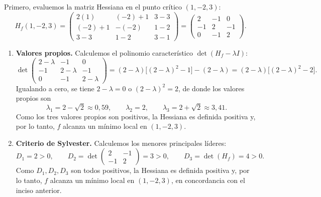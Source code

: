 \documentclass[11pt,respuestas,a4]{aleph-examen}
\begin{document}
\begin{preguntas}
\begin{respuesta}
Primero, evaluemos la matriz Hessiana en el punto crítico $(1,-2,3)$:
\[
    H_f(1,-2,3)
    =
    \begin{pmatrix}
        2(1) & (-2)+1 & 3-3\\
        (-2)+1 & -(-2) & 1-2\\
        3-3 & 1-2 & 3-1
    \end{pmatrix}
    =
    \begin{pmatrix}
        2 & -1 & 0\\
        -1 & 2 & -1\\
        0 & -1 & 2
    \end{pmatrix}.
\]
\begin{enumerate}
    \item \textbf{Valores propios.} Calculemos el polinomio característico $\det(H_f - \lambda I)$:
    \[
        \det
        \begin{pmatrix}
            2-\lambda & -1 & 0\\
            -1 & 2-\lambda & -1\\
            0 & -1 & 2-\lambda
        \end{pmatrix}
        =
        (2-\lambda)\bigl[(2-\lambda)^2 - 1\bigr] - (2-\lambda)
        =
        (2-\lambda)\bigl[(2-\lambda)^2 - 2\bigr].
    \]
    Igualando a cero, se tiene $2-\lambda = 0$ o $(2-\lambda)^2 = 2$, de donde los valores propios son
    \[
        \lambda_1 = 2-\sqrt{2}\approx 0{,}59,
        \qquad
        \lambda_2 = 2,
        \qquad
        \lambda_3 = 2+\sqrt{2}\approx 3{,}41.
    \]
    Como los tres valores propios son positivos, la Hessiana es definida positiva y, por lo tanto, $f$ alcanza un {mínimo} local en $(1,-2,3)$.

    \item \textbf{Criterio de Sylvester.} Calculemos los menores principales líderes:
    \[
        D_1 = 2 > 0,
        \qquad
        D_2 = \det\begin{pmatrix} 2 & -1\\ -1 & 2 \end{pmatrix} = 3 > 0,
        \qquad
        D_3 = \det(H_f) = 4 > 0.
    \]
    Como $D_1, D_2, D_3$ son todos positivos, la Hessiana es definida positiva y, por lo tanto, $f$ alcanza un {mínimo} local en $(1,-2,3)$, en concordancia con el inciso anterior.\qedhere
\end{enumerate}
\end{respuesta}

\end{preguntas}
\end{document}
